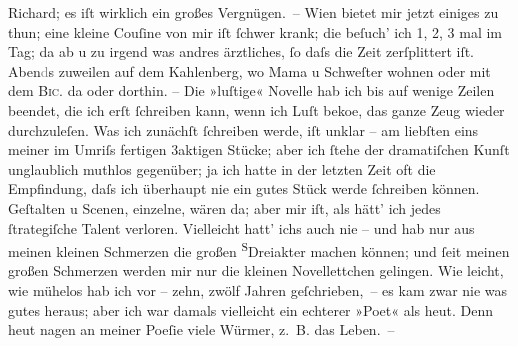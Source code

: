 \begin{ledgroupsized}[t]{13cm}
                        Richard; es iſt wirklich ein großes
                    Vergnügen. –\pend
           \pstart
           Wien bietet mir jetzt einiges zu thun; eine
                    kleine Couſine von mir iſt ſchwer krank;
                    die beſuch’ ich 1, 2, 3 mal im Tag; da{\geminationn} ab u zu
                    irgend was andres ärztliches, ſo daſs die Zeit zerſplittert iſt.
                        Aben\textcolor{gray}{d}s zuweilen auf dem Kahlenberg, wo Mama u Schweſter
                    wohnen oder mit dem \textsc{Bic.} da oder dorthin.\pend
           \pstart
           {\pb}– Die »luſtige« Novelle hab ich bis auf wenige Zeilen beendet, die ich erſt ſchreiben
                    kann, wenn ich Luſt beko{\geminationm}e, das ganze Zeug wieder
                    durchzuleſen. Was ich zunächſt ſchreiben werde, iſt unklar – am liebſten eins
                    meiner im Umriſs fertigen 3aktigen Stücke; aber ich ſtehe der dramatiſchen Kunſt
                    unglaublich muthlos gegenüber; ja ich hatte in der letzten Zeit oft die
                    Empfindung, daſs ich überhaupt nie {\pb}ein gutes
                    Stück werde ſchreiben können. Geſtalten u Scenen, einzelne, wären da; aber mir
                    iſt, als hätt’ ich jedes ſtrategiſche Talent verloren. Vielleicht hatt’ ichs
                    auch nie – und hab nur aus meinen kleinen Schmerzen die großen \substVorne{}\textsuperscript{S}\substDazwischen{}D\substHinten{}reiakter machen können; und ſeit meinen großen Schmerzen  werden mir nur die kleinen Novellettchen
                    gelingen. Wie leicht, wie mühelos hab ich vor – zehn, zwölf Jahren
                    geſchrieben, – {\pb}es kam zwar nie was gutes heraus;
                    aber ich war damals vielleicht ein echterer »Poet« als heut. Denn heut nagen an
                    meiner Poeſie viele Würmer, z. B. das Leben. –\pend

\end{ledgroupsized}
